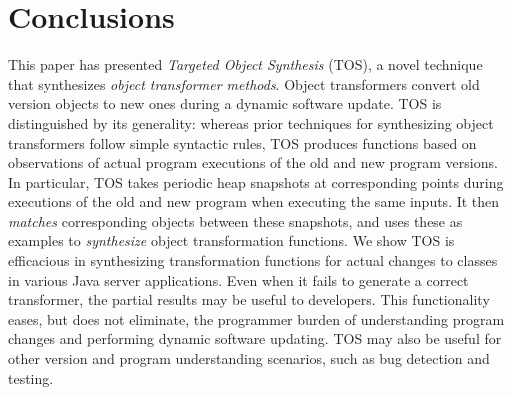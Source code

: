 \documentclass[natbib,10pt]{sigplanconf}
\newcommand{\TOSAcronym}{\emph{Targeted Object Synthesis} (TOS)\xspace}
\newcommand{\TOS}{TOS\xspace}
\newcommand{\stephen}[1]{\textcolor{Red}{Stephen: #1}}
\begin{document}



\section{Conclusions}



This paper has presented \TOSAcronym, a novel technique that
synthesizes \emph{object transformer methods}. Object transformers
convert old version objects to new ones during a dynamic software
update.  \TOS is distinguished by its generality: whereas prior
techniques for synthesizing object transformers follow simple
syntactic rules, \TOS produces functions based on observations of
actual program executions of the old and new program versions.  In
particular, \TOS takes periodic heap snapshots at corresponding points
during executions of the old and new program when executing the
same inputs.  It then \emph{matches} corresponding objects between
these snapshots, and uses these as examples to \emph{synthesize}
object transformation functions.  We show \TOS is efficacious in
synthesizing transformation functions for actual changes to classes in
various Java server applications. Even when it fails to generate a
correct transformer, the partial results may be useful to
developers.  This functionality eases, but does not eliminate, the
programmer burden of understanding program changes and performing
dynamic software updating.  \TOS may also be useful for other version and
program understanding scenarios, such as bug detection
and testing.
\end{document}
